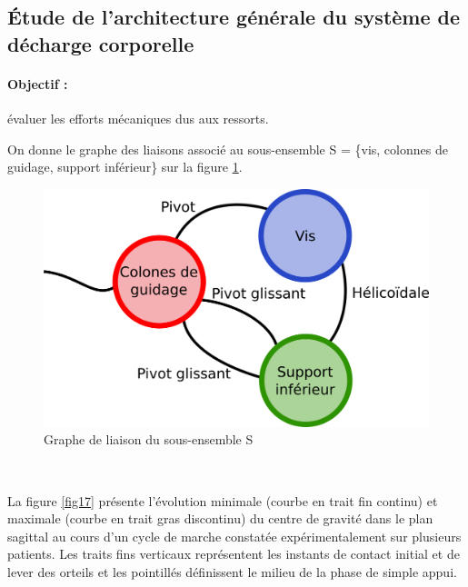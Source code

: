 \subsection{Étude de l'architecture générale du système de décharge corporelle}

\paragraph{Objectif :} évaluer les efforts mécaniques dus aux ressorts.


On donne le graphe des liaisons associé au sous-ensemble S = \{vis, colonnes de guidage, support inférieur\} sur la figure \ref{figgraphe_liaison}.

\begin{figure}[ht!]
\begin{center}
 \includegraphics[width=0.4\linewidth]{img/graphe_liaison.png}
\end{center}
\caption{\label{figgraphe_liaison} Graphe de liaison du sous-ensemble S}
\end{figure}





~\

La figure \ref{fig17} présente l'évolution minimale (courbe en trait fin continu) et maximale (courbe en trait gras discontinu) du centre de gravité dans le plan sagittal au cours d'un cycle de marche constatée expérimentalement sur plusieurs patients. Les traits fins verticaux représentent les instants de contact initial et de lever des orteils et les pointillés définissent le milieu de la phase de simple appui.

